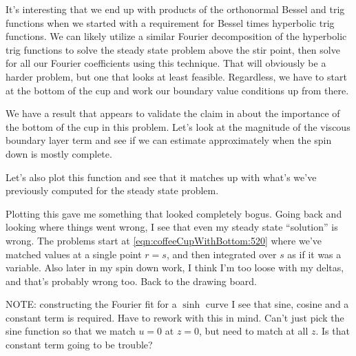It's interesting that we end up with products of the orthonormal Bessel and trig functions when we started with a requirement for Bessel times hyperbolic trig functions.  We can likely utilize a similar Fourier decomposition of the hyperbolic trig functions to solve the steady state problem above the stir point, then solve for all our Fourier coefficients using this technique.  That will obviously be a harder problem, but one that looks at least feasible.  Regardless, we have to start at the bottom of the cup and work our boundary value conditions up from there.  

We have a result that appears to validate the claim in \citep{acheson1990elementary} about the importance of the bottom of the cup in this problem.  Let's look at the magnitude of the viscous boundary layer term and see if we can estimate approximately when the spin down is mostly complete.

Let's also plot this function and see that it matches up with what's we've previously computed for the steady state problem.

Plotting this gave me something that looked completely bogus.  Going back and looking where things went wrong, I see that even my steady state ``solution'' is wrong.  The problems start at \ref{eqn:coffeeCupWithBottom:520} where we've matched values at a single point $r = s$, and then integrated over $s$ as if it was a variable.  Also later in my spin down work, I think I'm too loose with my deltas, and that's probably wrong too.  Back to the drawing board.

NOTE: constructing the Fourier fit for a $\sinh$ curve I see that sine, cosine and a constant term is required.  Have to rework with this in mind.  Can't just pick the sine function so that we match $u = 0$ at $z = 0$, but need to match at all $z$.  Is that constant term going to be trouble?
